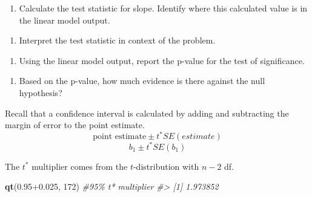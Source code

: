 \documentclass[
]{report}
\newenvironment{Shaded}{\begin{snugshade}}{\end{snugshade}}
\newcommand{\CommentTok}[1]{\textcolor[rgb]{0.56,0.35,0.01}{\textit{#1}}}
\newcommand{\DecValTok}[1]{\textcolor[rgb]{0.00,0.00,0.81}{#1}}
\newcommand{\FloatTok}[1]{\textcolor[rgb]{0.00,0.00,0.81}{#1}}
\newcommand{\KeywordTok}[1]{\textcolor[rgb]{0.13,0.29,0.53}{\textbf{#1}}}
\newcommand{\NormalTok}[1]{#1}
\providecommand{\tightlist}{%
  \setlength{\itemsep}{0pt}\setlength{\parskip}{0pt}}
\begin{document}
\begin{enumerate}
\def\labelenumi{\arabic{enumi}.}
\setcounter{enumi}{11}
\tightlist
\item
  Calculate the test statistic for slope. Identify where this calculated value is in the linear model output.
\end{enumerate}

\vspace{1in}

\begin{enumerate}
\def\labelenumi{\arabic{enumi}.}
\setcounter{enumi}{12}
\tightlist
\item
  Interpret the test statistic in context of the problem.
\end{enumerate}

\vspace{1in}

\begin{enumerate}
\def\labelenumi{\arabic{enumi}.}
\setcounter{enumi}{13}
\tightlist
\item
  Using the linear model output, report the p-value for the test of significance.
\end{enumerate}

\vspace{0.5in}

\begin{enumerate}
\def\labelenumi{\arabic{enumi}.}
\setcounter{enumi}{14}
\tightlist
\item
  Based on the p-value, how much evidence is there against the null hypothesis?
\end{enumerate}

\vspace{0.5in}

Recall that a confidence interval is calculated by adding and subtracting the margin of error to the point estimate.\\
\[\mbox{point estimate}\pm t^*SE(estimate)\]
\[b_1 \pm t^* SE(b_1)\]

The \(t^*\) multiplier comes from the \(t\)-distribution with \(n-2\) df.

\begin{Shaded}
\begin{Highlighting}[]
\KeywordTok{qt}\NormalTok{(}\FloatTok{0.95+0.025}\NormalTok{, }\DecValTok{172}\NormalTok{) }\CommentTok{\#95\% t* multiplier }
\CommentTok{\#\textgreater{} [1] 1.973852}
\end{Highlighting}
\end{Shaded}
\end{document}
